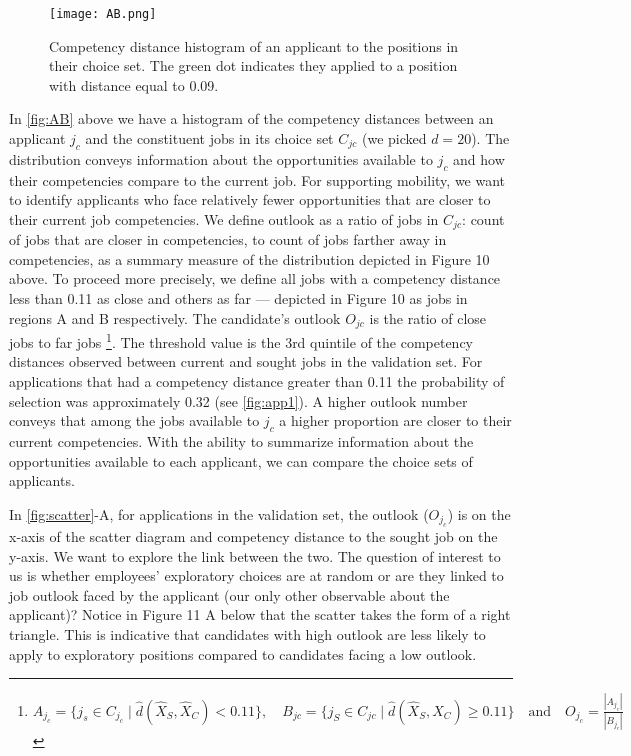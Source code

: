 \documentclass{article}
\begin{document}
\begin{figure}[!ht]
    \centering
    \texttt{[image: AB.png]} %
    \caption{Competency distance histogram of an applicant to the positions in their choice set. The green dot indicates they applied to a position with distance equal to 0.09.} %
    \label{fig:AB} 
\end{figure}

In \autoref{fig:AB} above we have a histogram of the competency distances between an applicant \(j_c\) and the constituent jobs in its choice set \(C_{jc}\) (we picked \(d = 20\)). The distribution conveys information about the opportunities available to \(j_c\) and how their competencies compare to the current job. For supporting mobility, we want to identify applicants who face relatively fewer opportunities that are closer to their current job competencies. We define outlook as a ratio of jobs in \(C_{jc}\): count of jobs that are closer in competencies, to count of jobs farther away in competencies, as a summary measure of the distribution depicted in Figure 10 above. To proceed more precisely, we define all jobs with a competency distance less than 0.11 as close and others as far — depicted in Figure 10 as jobs in regions A and B respectively. The candidate’s outlook \(O_{jc}\) is the ratio of close jobs to far jobs \footnote{$A_{j_c} = \{j_s \in C_{j_c} \mid \hat{d}(\hat{X}_S, \hat{X}_C) < 0.11\}, \quad B_{jc} = \{j_S \in C_{jc} \mid \hat{d}(\hat{X}_S, \hat{X}_C) \geq 0.11\} \quad \text{and} \quad O_{j_c} = \frac{|A_{j_c}|}{|B_{j_c}|}$}. The threshold value is the 3rd quintile of the competency distances observed between current and sought jobs in the validation set. For applications that had a competency distance greater than 0.11 the probability of selection was approximately 0.32 (see \autoref{fig:app1}). A higher outlook number conveys that among the jobs available to \(j_c\) a higher proportion are closer to their current competencies. With the ability to summarize information about the opportunities available to each applicant, we can compare the choice sets of applicants.


In \autoref{fig:scatter}-A, for applications in the validation set, the outlook ($O_{j_c}$) is on the x-axis of the scatter diagram and competency distance to the sought job on the y-axis. We want to explore the link between the two. The question of interest to us is whether employees’ exploratory choices are at random or are they linked to job outlook faced by the applicant (our only other observable about the applicant)? Notice in Figure 11 A below that the scatter takes the form of a right triangle. This is indicative that candidates with high outlook are less likely to apply to exploratory positions compared to candidates facing a low outlook. 
\end{document}

